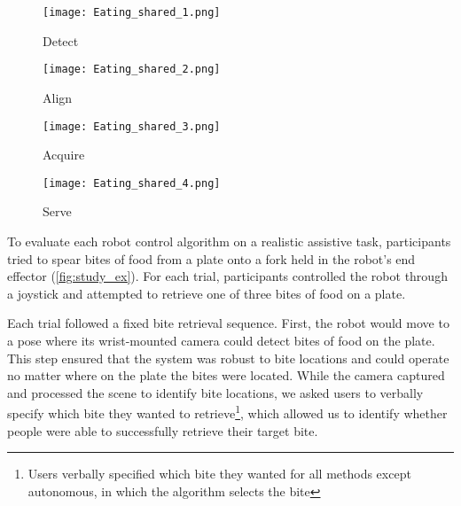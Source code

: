 \begin{figure*}[t]
\centering
  \begin{subfigure}{0.240\textwidth}
    \texttt{[image: Eating\_shared\_1.png]}
    \caption{Detect}
    \label{subfig:study_1}
  \end{subfigure}
  \hfill
  \begin{subfigure}{0.240\textwidth}
    \texttt{[image: Eating\_shared\_2.png]}
    \caption{Align}
    \label{subfig:study_2}
  \end{subfigure}
  \hfill
  \begin{subfigure}{0.240\textwidth}
    \texttt{[image: Eating\_shared\_3.png]}
    \caption{Acquire}
    \label{subfig:study_3}
  \end{subfigure}
  \hfill
  \begin{subfigure}{0.240\textwidth}
    \texttt{[image: Eating\_shared\_4.png]}
    \caption{Serve}
    \label{subfig:study_4}
  \end{subfigure}
  \caption{Our bite grasping study. A plate with three bites of food was placed in front of users. () The robot start by detecting the pose of all bites of food. () The user then uses one of the four methods to align the fork with their desired bite. When the user indicates they are aligned, the robot automatically () acquires and () serves the bite.}
  \label{fig:study_ex}
\end{figure*}


To evaluate each robot control algorithm on a realistic assistive task, participants tried to spear bites of food from a plate onto a fork held in the robot's end effector (\cref{fig:study_ex}). For each trial, participants controlled the robot through a joystick and attempted to retrieve one of three bites of food on a plate.

Each trial followed a fixed bite retrieval sequence. First, the robot would move to a pose where its wrist-mounted camera could detect bites of food on the plate. This step ensured that the system was robust to bite locations and could operate no matter where on the plate the bites were located. While the camera captured and processed the scene to identify bite locations, we asked users to verbally specify which bite they wanted to retrieve\footnote{Users verbally specified which bite they wanted for all methods except autonomous, in which the algorithm selects the bite}, which allowed us to identify whether people were able to successfully retrieve their target bite. 

